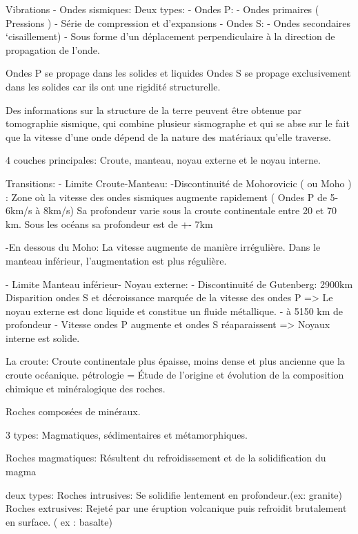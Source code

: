 Vibrations - Ondes sismiques:
Deux types:
- Ondes P:
        - Ondes primaires ( Pressions )
        - Série de compression et d’expansions
- Ondes S:
        - Ondes secondaires ‘cisaillement)
- Sous forme d’un déplacement perpendiculaire à la direction de propagation 
de l’onde.




Ondes P se propage dans les solides et liquides
Ondes S se propage exclusivement dans les solides car ils ont une rigidité structurelle.


Des informations sur la structure de la terre peuvent être obtenue par tomographie sismique, qui combine plusieur sismographe et qui se abse sur le fait que la vitesse d’une onde dépend de la nature des matériaux qu’elle traverse.


  



4 couches principales: Croute, manteau, noyau externe et le noyau interne.


Transitions:
- Limite Croute-Manteau:
-Discontinuité de Mohorovicic ( ou Moho ) : Zone où la vitesse des ondes sismiques 
augmente rapidement ( Ondes P de 5-6km/s à 8km/s)
Sa profondeur varie sous la croute continentale entre 20 et 70 km.
Sous les océans sa profondeur est de  +- 7km


-En dessous du Moho: La vitesse augmente de manière irrégulière.
Dans le manteau inférieur, l’augmentation est plus régulière.



- Limite Manteau inférieur- Noyau externe:
        - Discontinuité de Gutenberg: 2900km
        Disparition ondes S et décroissance marquée de la vitesse des ondes P
        => Le noyau externe est donc liquide et constitue un fluide métallique.
- à 5150 km de profondeur
        - Vitesse ondes P augmente et ondes S réaparaissent
        => Noyaux interne est solide.




La croute:
Croute continentale plus épaisse, moins dense et plus ancienne que la croute océanique.
pétrologie = Étude de l’origine et évolution de la composition chimique et minéralogique des roches.


Roches composées de minéraux.


3 types: Magmatiques, sédimentaires et métamorphiques.


Roches magmatiques:
Résultent du refroidissement et de la solidification du magma


deux types:
Roches intrusives: Se solidifie lentement en profondeur.(ex: granite)
Roches extrusives: Rejeté par une éruption volcanique puis refroidit brutalement en surface. ( ex : basalte)



